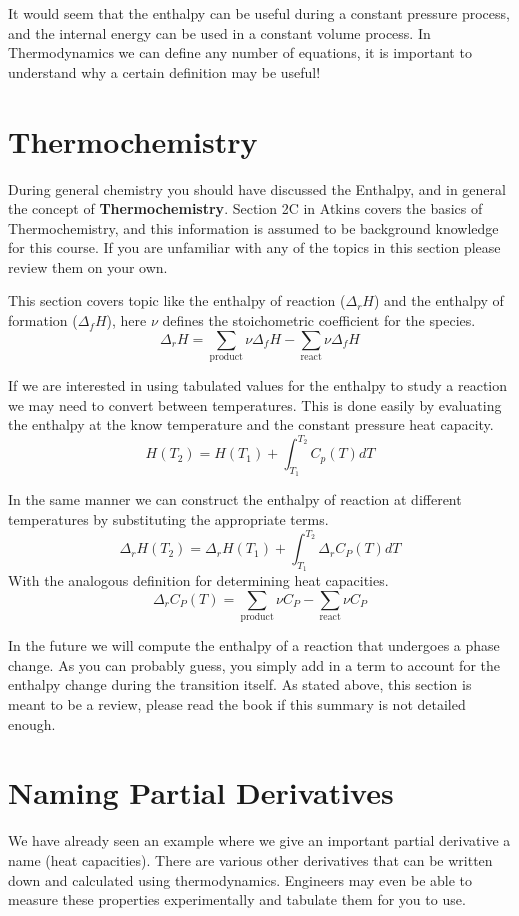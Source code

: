 \documentclass{article}
\newcommand{\be}{\begin{equation}}
\newcommand{\ee}{\end{equation}}
\begin{document}
It would seem that the enthalpy can be useful during a constant pressure process, and the internal energy can be used in a constant volume process. 
In Thermodynamics we can define any number of equations, it is important to understand why a certain definition may be useful!

\section*{Thermochemistry}
During general chemistry you should have discussed the Enthalpy, and in general the concept of \textbf{Thermochemistry}. 
Section 2C in Atkins covers the basics of Thermochemistry, and this information is assumed to be background knowledge for this course. 
If you are unfamiliar with any of the topics in this section please review them on your own. 

This section covers topic like the enthalpy of reaction ($\Delta_rH $) and the enthalpy of formation ($\Delta_fH $), here $\nu$ defines the stoichometric coefficient for the species. 
\be
\Delta_rH = \sum_{\text{product}}\nu \Delta_fH - \sum_{\text{react}}\nu\Delta_fH
\ee

If we are interested in using tabulated values for the enthalpy to study a reaction we may need to convert between temperatures.
This is done easily by evaluating the enthalpy at the know temperature and the constant pressure heat capacity. 
\be
H(T_2) = H(T_1) + \int_{T_1}^{T_2} C_p(T) dT
\ee

In the same manner we can construct the enthalpy of reaction at different temperatures by substituting the appropriate terms. 
\be
\Delta_rH(T_2) = \Delta_rH(T_1) + \int_{T_1}^{T_2} \Delta_rC_P(T) dT
\ee
With the analogous definition for determining heat capacities.
\be
\Delta_rC_P(T) = \sum_{\text{product}}\nu  C_P - \sum_{\text{react}}\nu C_P
\ee

In the future we will compute the enthalpy of a reaction that undergoes a phase change.
As you can probably guess, you simply add in a term to account for the enthalpy change during the transition itself. 
As stated above, this section is meant to be a review, please read the book if this summary is not detailed enough.

\section*{Naming Partial Derivatives}
We have already seen an example where we give an important partial derivative a name (heat capacities). 
There are various other derivatives that can be written down and calculated using thermodynamics. 
Engineers may even be able to measure these properties experimentally and tabulate them for you to use. 
\end{document}
